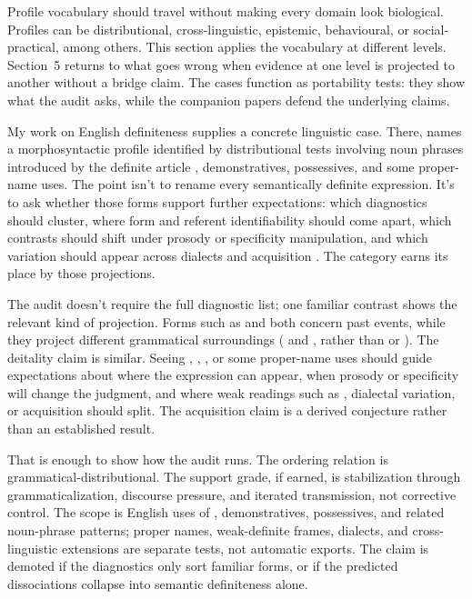 \documentclass[12pt]{article}
\begin{document}
Profile vocabulary should travel without making every domain look biological.
Profiles can be distributional, cross-linguistic, epistemic, behavioural, or
social-practical, among others. This section applies the vocabulary at different
levels. Section~5 returns to what goes wrong when evidence at one level is
projected to another without a bridge claim. The cases function as portability
tests: they show what the audit asks, while the companion papers defend the
underlying claims.

My work on English definiteness supplies a concrete linguistic case. There,
 names a morphosyntactic profile identified by distributional
tests involving noun phrases introduced by the definite article ,
demonstratives, possessives, and some proper-name uses. The point isn't to
rename every semantically definite expression. It's to ask whether those forms
support further expectations: which diagnostics should cluster, where form and
referent identifiability should come apart, which contrasts should shift under
prosody or specificity manipulation, and which variation should appear across
dialects and acquisition \citep{reynolds2025definitenessProjectibility}. The
category earns its place by those projections.

The audit doesn't require the full diagnostic list; one familiar contrast shows
the relevant kind of projection. Forms such as  and
 both concern past events, while they project different
grammatical surroundings
( and , rather than
 or ). The deitality claim is
similar. Seeing , , , or some proper-name
uses should guide expectations about where the expression can appear, when
prosody or specificity will change the judgment, and where weak readings such as
, dialectal variation, or acquisition should split.
The acquisition claim is a derived conjecture rather than an established result.

That is enough to show how the audit runs. The ordering relation is
grammatical-distributional. The support grade, if earned, is stabilization
through grammaticalization, discourse pressure, and iterated transmission, not
corrective control. The scope is English uses of , demonstratives,
possessives, and related noun-phrase patterns; proper names, weak-definite
frames, dialects, and cross-linguistic extensions are separate tests, not
automatic exports. The claim is demoted if the diagnostics only sort familiar
forms, or if the predicted dissociations collapse into semantic definiteness
alone.
\end{document}
